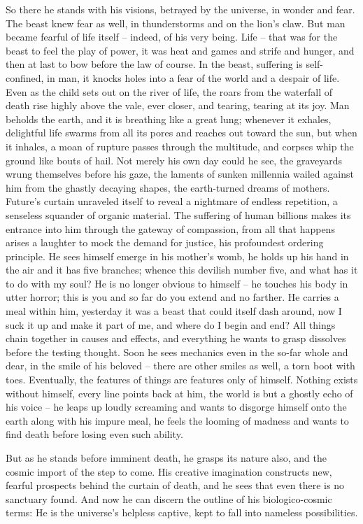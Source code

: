 \documentclass[draft,a4paper,10pt,twocolumn]{article}
\begin{document}
So there he stands with his visions, betrayed by the universe, in wonder and fear. The beast knew fear as well, in thunderstorms and on the lion's claw. But man became fearful of life itself -- indeed, of his very being. Life -- that was for the beast to feel the play of power, it was heat and games and strife and hunger, and then at last to bow before the law of course. In the beast, suffering is self-confined, in man, it knocks holes into a fear of the world and a despair of life. Even as the child sets out on the river of life, the roars from the waterfall of death rise highly above the vale, ever closer, and tearing, tearing at its joy. Man beholds the earth, and it is breathing like a great lung; whenever it exhales, delightful life swarms from all its pores and reaches out toward the sun, but when it inhales, a moan of rupture passes through the multitude, and corpses whip the ground like bouts of hail. Not merely his own day could he see, the graveyards wrung themselves before his gaze, the laments of sunken millennia wailed against him from the ghastly decaying shapes, the earth-turned dreams of mothers. Future's curtain unraveled itself to reveal a nightmare of endless repetition, a senseless squander of organic material. The suffering of human billions makes its entrance into him through the gateway of compassion, from all that happens arises a laughter to mock the demand for justice, his profoundest ordering principle. He sees himself emerge in his mother's womb, he holds up his hand in the air and it has five branches; whence this devilish number five, and what has it to do with my soul? He is no longer obvious to himself -- he touches his body in utter horror; this is you and so far do you extend and no farther. He carries a meal within him, yesterday it was a beast that could itself dash around, now I suck it up and make it part of me, and where do I begin and end? All things chain together in causes and effects, and everything he wants to grasp dissolves before the testing thought. Soon he sees mechanics even in the so-far whole and dear, in the smile of his beloved -- there are other smiles as well, a torn boot with toes. Eventually, the features of things are features only of himself. Nothing exists without himself, every line points back at him, the world is but a ghostly echo of his voice -- he leaps up loudly screaming and wants to disgorge himself onto the earth along with his impure meal, he feels the looming of madness and wants to find death before losing even such ability.

But as he stands before imminent death, he grasps its nature also, and the cosmic import of the step to come. His creative imagination constructs new, fearful prospects behind the curtain of death, and he sees that even there is no sanctuary found. And now he can discern the outline of his biologico-cosmic terms: He is the universe's helpless captive, kept to fall into nameless possibilities.
\end{document}
